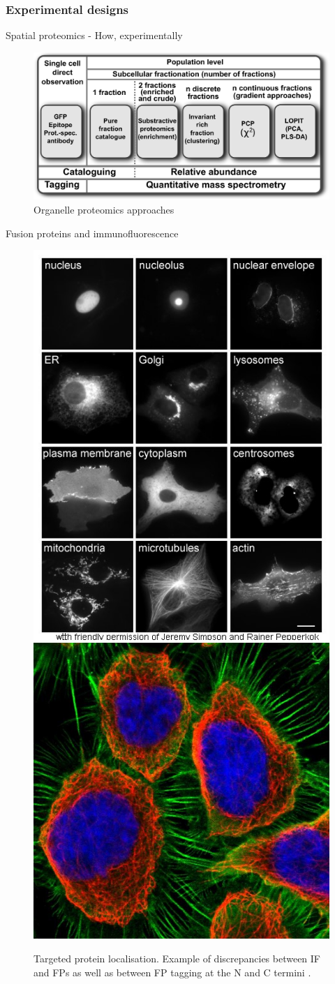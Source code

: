 \subsubsection*{Experimental designs}
\label{sec:expdesign}

\begin{frame}{Spatial proteomics - How, experimentally}
  \begin{figure}
    \includegraphics[width=.8\linewidth]{figs_all/F02-expdesigns.pdf}
    \caption{Organelle proteomics approaches \citep{Gatto:2010}}
  \end{figure}
\end{frame}

\begin{frame}{Fusion proteins and immunofluorescence}

  \begin{figure}[h]
    \centering
    \includegraphics[width=.35\linewidth]{figs_all/Localisations02eng.jpg}
    \includegraphics[width=.45\linewidth]{figs_all/if_selected.jpg}
    \caption{Targeted protein localisation. Example of discrepancies
      between IF and FPs as well as between FP tagging at the N and C
      termini \citep{Stadler:2013}.}
  \end{figure}
\end{frame}


